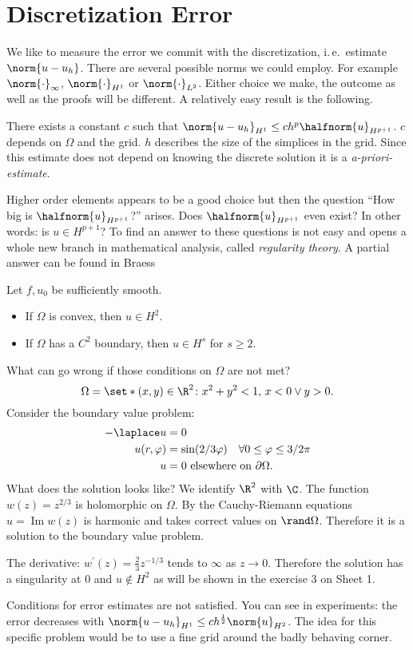 \section{Discretization Error}
We like to measure the error we commit with the discretization, i.\,e.\ estimate $\norm{u-u_h}$. There are several possible norms we could employ. For example $\norm{\cdot}_\infty$, $\norm{\cdot}_{H^1}$ or $\norm{\cdot}_{L^2}$. Either choice we make, the outcome as well as the proofs will be different. A relatively easy result is the following.
\begin{theorem}
  There exists a constant $c$ such that $\norm{u-u_h}_{H^1}\leq ch^p\halfnorm{u}_{H^{p+1}}$. $c$ depends on $\Omega$ and the grid. $h$ describes the size of the simplices in the grid. Since this estimate does not depend on knowing the discrete solution it is a \textit{a-priori-estimate}.
\end{theorem}
Higher order elements appears to be a good choice but then
the question \enquote{How big is $\halfnorm{u}_{H^{p+1}}$?} arises. Does $\halfnorm{u}_{H^{p+1}}$ even exist? In other words: is $u\in H^{p+1}$? To find an answer to these questions is not easy and opens a whole new branch in mathematical analysis, called \textit{regularity theory}. A partial answer can be found in Braess %
\begin{theorem}%
Let $f,u_0$ be sufficiently smooth.
\begin{itemize}
  \item If $\Omega$ is convex, then $u\in H^2$.
  \item If $\Omega$ has a $C^2$ boundary, then $u\in H^s$ for $s\geq 2$.
\end{itemize}
\end{theorem}
\begin{example}
What can go wrong if those conditions on $\Omega$ are not met?
\begin{equation*}
  \Omega=\set*{(x,y)\in\R^2\colon x^2+y^2<1,\,x<0\lor y>0}.
\end{equation*}
Consider the boundary value problem:
\begin{align*}
	-\laplace u&=0\\
	u(r,\varphi)&=\sin(2/3\varphi)\quad \forall 0\leq\varphi\leq3/2\pi \\
	u&=0 \text{ elsewhere on } \partial\Omega.
\end{align*}
What does the solution looks like? We identify $\R^2$ with $\C$. The function $w(z)=z^{2/3}$ is holomorphic on $\Omega$. By the Cauchy-Riemann equations $u = \operatorname{Im}w(z)$ is harmonic and takes correct values on $\rand\Omega$. Therefore it is a solution to the boundary value problem.

The derivative: $w^\prime(z)=\frac23z^{-1/3}$ tends to $\infty$ as $z\to 0$. Therefore the solution has a singularity at $0$ and $u\notin H^2$ as will be shown in the exercise 3 on Sheet 1.
\end{example}

Conditions for error estimates are not satisfied. You can see in experiments: the error decreases with $\norm{u - u_h}_{H^1} \leq c h^{\frac{1}{2}}\norm{u}_{H^2}$. The idea for this specific problem would be to use a fine grid around the badly behaving corner.

